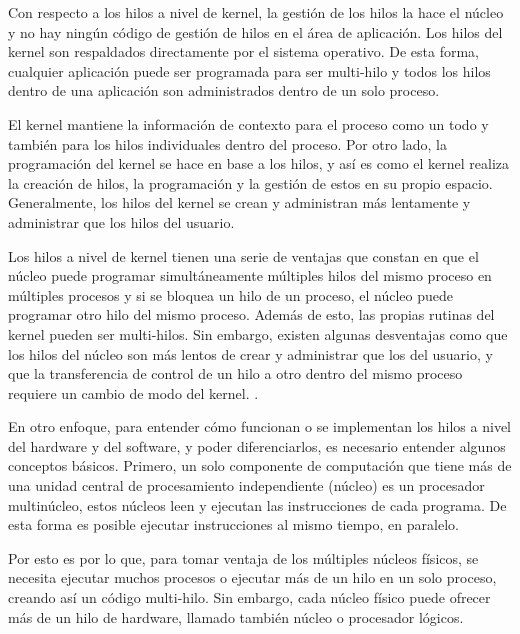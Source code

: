 \documentclass[12pt]{article}
\begin{document}
{Con respecto a los hilos a nivel de kernel, la gestión de los hilos la hace el núcleo y no hay ningún código de gestión de hilos en el área de aplicación. Los hilos del kernel son respaldados directamente por el sistema operativo. De esta forma, cualquier aplicación puede ser programada para ser multi-hilo y todos los hilos dentro de una aplicación son administrados dentro de un solo proceso.
\newline

El kernel mantiene la información de contexto para el proceso como un todo y también para los hilos individuales dentro del proceso. Por otro lado, la programación del kernel se hace en base a los hilos, y así es como el kernel realiza la creación de hilos, la programación y la gestión de estos en su propio espacio. Generalmente, los hilos del kernel se crean y administran más lentamente y administrar que los hilos del usuario.
\newline

Los hilos a nivel de kernel tienen una serie de ventajas que constan en que el núcleo puede programar simultáneamente múltiples hilos del mismo proceso en múltiples procesos y si se bloquea un hilo de un proceso, el núcleo puede programar otro hilo del mismo proceso. Además de esto, las propias rutinas del kernel pueden ser multi-hilos. Sin embargo, existen algunas desventajas como que los hilos del núcleo son más lentos de crear y administrar que los del usuario, y que la transferencia de control de un hilo a otro dentro del mismo proceso requiere un cambio de modo del kernel. \citep{Softm}.
\newline

En otro enfoque, para entender cómo funcionan o se implementan los hilos a nivel del hardware y del software, y poder diferenciarlos, es necesario entender algunos conceptos básicos. Primero, un solo componente de computación que tiene más de una unidad central de procesamiento independiente (núcleo) es un procesador multinúcleo, estos núcleos leen y ejecutan las instrucciones de cada programa. De esta forma es posible ejecutar instrucciones al mismo tiempo, en paralelo.
\newline

Por esto es por lo que, para tomar ventaja de los múltiples núcleos físicos, se necesita ejecutar muchos procesos o ejecutar más de un hilo en un solo proceso, creando así un código multi-hilo. Sin embargo, cada núcleo físico puede ofrecer más de un hilo de hardware, llamado también núcleo o procesador lógicos.
\newline

}
\end{document}

